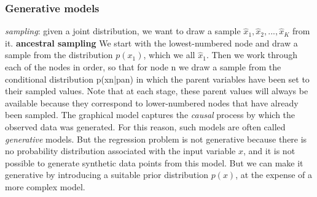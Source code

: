 \documentclass[a4paper]{book}
\begin{document}
\subsubsection{Generative models}
\textit{sampling}: given a joint distribution, we want to draw a sample $\hat x_1, \hat x_2, ..., \hat x_K$ from it.
\textbf{ancestral sampling}
\newline
We start with the lowest-numbered node and draw a sample from the distribution $p(x_1)$, which we all $\hat x_1$. Then we work through each of the nodes in order, so that for node n we draw a sample from the conditional distribution p(xn|pan)
in which the parent variables have been set to their sampled values. Note that at each stage, these parent values will always be available because they correspond to lower-numbered
nodes that have already been sampled. The graphical model captures the \textit{causal} process by which the observed data was generated. For this reason, such models are often called \textit{generative} models. But the regression problem is not generative because there is no probability distribution associated with the input variable $x$, and it is not possible to generate synthetic data points from this model. But we can make it generative by introducing a suitable prior distribution $p(x)$, at the expense of a more complex model.
\end{document}
